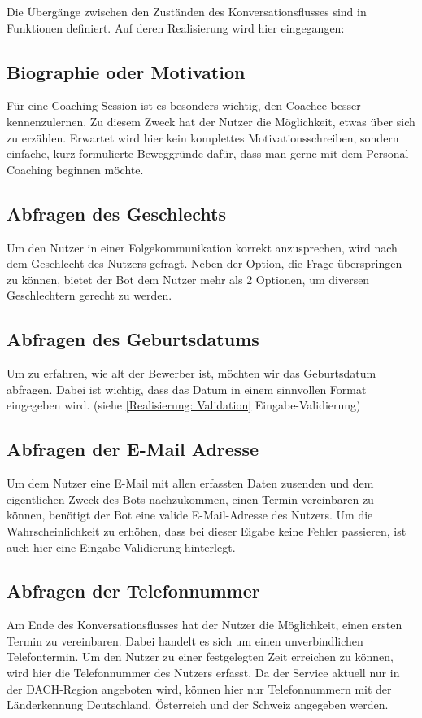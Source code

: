        Die Übergänge zwischen den Zuständen des Konversationsflusses sind in Funktionen definiert. Auf deren Realisierung wird hier eingegangen:
        
        \subsection{Biographie oder Motivation}
            Für eine Coaching-Session ist es besonders wichtig, den Coachee besser kennenzulernen. Zu diesem Zweck hat der Nutzer die Möglichkeit, etwas über sich zu erzählen. Erwartet wird hier kein komplettes Motivationsschreiben, sondern einfache, kurz formulierte Beweggründe dafür, dass man gerne mit dem Personal Coaching beginnen möchte. 
        
        \subsection{Abfragen des Geschlechts}
            Um den Nutzer in einer Folgekommunikation korrekt anzusprechen, wird nach dem Geschlecht des Nutzers gefragt. Neben der Option, die Frage überspringen zu können, bietet der Bot dem Nutzer mehr als 2 Optionen, um diversen Geschlechtern gerecht zu werden.
        
        \subsection{Abfragen des Geburtsdatums}    
            Um zu erfahren, wie alt der Bewerber ist, möchten wir das Geburtsdatum abfragen. Dabei ist wichtig, dass das Datum in einem sinnvollen Format eingegeben wird. (siehe \ref*{Realisierung: Validation} Eingabe-Validierung)
        
        \subsection{Abfragen der E-Mail Adresse}
            Um dem Nutzer eine E-Mail mit allen erfassten Daten zusenden und dem eigentlichen Zweck des Bots nachzukommen, einen Termin vereinbaren zu können, benötigt der Bot eine valide E-Mail-Adresse des Nutzers. Um die Wahrscheinlichkeit zu erhöhen, dass bei dieser Eigabe keine Fehler passieren, ist auch hier eine Eingabe-Validierung hinterlegt.
        
        \subsection{Abfragen der Telefonnummer}
            Am Ende des Konversationsflusses hat der Nutzer die Möglichkeit, einen ersten Termin zu vereinbaren. Dabei handelt es sich um einen unverbindlichen Telefontermin. Um den Nutzer zu einer festgelegten Zeit erreichen zu können, wird hier die Telefonnummer des Nutzers erfasst. Da der Service aktuell nur in der DACH-Region angeboten wird, können hier nur Telefonnummern mit der Länderkennung Deutschland, Österreich und der Schweiz angegeben werden. 
        
